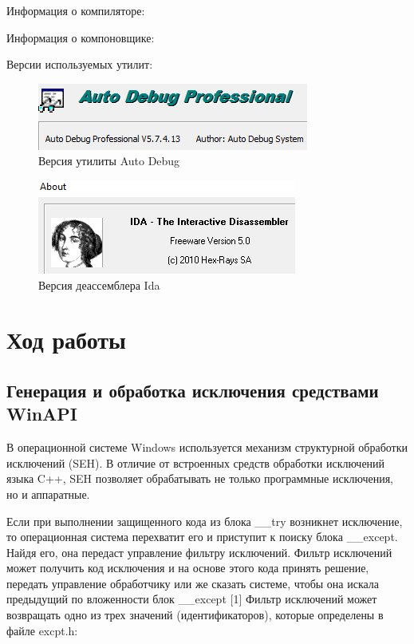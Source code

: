 \documentclass[14pt,a4paper,report]{report}
\begin{document}
Информация о компиляторе:



Информация о компоновщике:



Версии используемых утилит:

\begin{figure}[h!]
	\centering
	\includegraphics[scale = 1.15]{images/0_d.png}
	\caption{Версия утилиты Auto Debug}
\end{figure}

\begin{figure}[h!]
	\centering
	\includegraphics[scale = 1.15]{images/0_i.png}
	\caption{Версия деассемблера Ida}
\end{figure} 

\clearpage

\section{Ход работы}

\subsection{Генерация и обработка исключения средствами WinAPI}

В операционной системе Windows используется  механизм структурной обработки исключений (SEH). В отличие от встроенных средств обработки исключений языка C++, SEH позволяет обрабатывать не только программные исключения, но и аппаратные.



Если при выполнении защищенного кода из блока \_\_try возникнет исключение, то операционная система перехватит его и приступит к поиску блока \_\_except. Найдя его, она передаст управление фильтру исключений. Фильтр исключений может получить код исключения и на основе этого кода принять решение, передать управление обработчику или же сказать системе, чтобы она искала предыдущий по вложенности блок \_\_except [1] Фильтр исключений может возвращать одно из трех значений (идентификаторов), которые определены в файле excpt.h:
\end{document}
